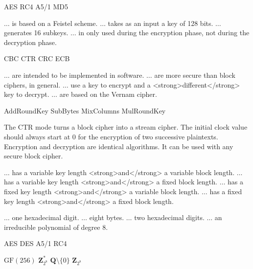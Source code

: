   
  {AES}
  {RC4} 
  {A5/1}
  {MD5}
  
 {$ \dots $ is based on a Feistel scheme.}
 {$ \dots $ takes as an input a key of 128 bits.}
 {$ \dots $ generates 16 subkeys.}
 {$ \dots $ in only used during the encryption phase, not during the decryption phase.}
	
 {CBC}  
 {CTR} 
 {CRC}
 {ECB}
 
 
 {$ \dots $ are intended to be implemented in software.}
 {$ \dots $ are more secure than block ciphers, in general.}
 {$ \dots $ use a key to encrypt and a <strong>different</strong> key to decrypt.}
 {$ \dots $ are based on the Vernam cipher.}
 
 
 {AddRoundKey}
 {SubBytes}
 {MixColumns}
 {MulRoundKey}
 
 {The CTR mode turns a block cipher into a stream cipher.}
 {The initial clock value should always start at 0 for the encryption of two successive plaintexts.}
 {Encryption and decryption are identical algorithms.}
 {It can be used with any secure block cipher.}
 
{$ \dots $ has a variable key length <strong>and</strong> a variable block length.}
{$ \dots $ has a variable key length <strong>and</strong> a fixed block length.}
{$ \dots $ has a fixed key length <strong>and</strong> a variable block length.}
{$ \dots $ has a fixed key length <strong>and</strong> a fixed block length.}
 
 {$ \dots $ one hexadecimal digit.}
 {$ \dots $ eight bytes.}
 {$ \dots $ two hexadecimal digits.}
 {$ \dots $ an irreducible polynomial of degree 8.}
 
{AES}
{DES}
{A5/1}
{RC4}

{$\mathrm{GF}(256)$} 
{$\mathbf{Z}_{2^8}^*$} 
{$\mathbf{Q}\setminus \{0\}$}
{$\mathbf{Z}_{2^8}$}


